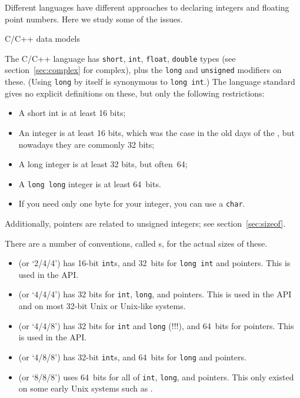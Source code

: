 Different languages have different approaches to declaring integers and
floating point numbers. Here we study some of the issues.

 {C/C++ data models}
\label{sec:data-model}

The C/C++ language has \lstinline{short}, \lstinline{int}, \lstinline{float},
\lstinline{double} types
(see section~\ref{sec:complex} for complex),
plus the \lstinline{long} and \lstinline{unsigned} modifiers on these.
(Using \lstinline{long} by itself is synonymous to \lstinline{long int}.)
%
The language standard gives no explicit definitions on these,
but only the following restrictions:
\begin{itemize}
\item A short int is at least 16 bits;
\item An integer is at least 16 bits, which was the case
  in the old days of the ,
  but nowadays they are commonly 32 bits;
\item A long integer is at least 32 bits, but often~64;
\item A \lstinline{long long} integer is at least 64~bits.
\item If you need only one byte for your integer, you can use a \lstinline{char}.
\end{itemize}
Additionally, pointers are related to unsigned integers;
see section~\ref{sec:sizeof}.

There are a number of conventions, called s,
for the actual sizes of these.
\begin{itemize}
\item {} (or `2/4/4') has 16-bit \lstinline{int}s,
  and 32~bits for \lstinline{long int} and pointers.
  This is used in the  \acs{API}.
\item {} (or `4/4/4')
  has 32 bits for \lstinline{int}, \lstinline{long}, and pointers.
  This is used in the  \acs{API}
  and on most 32-bit Unix or Unix-like systems.
\item {} (or `4/4/8')
  has 32 bits for \lstinline{int} and \lstinline{long} (!!!),
  and 64~bits for pointers.
  This is used in the  API.
\item {} (or `4/8/8')
  has 32-bit \lstinline{int}s, and 64~bits for \lstinline{long} and pointers.
\item {} (or `8/8/8') uses 64~bits for all of
  \lstinline{int}, \lstinline{long}, and pointers.
  This only existed on some early Unix systems such as
  .
\end{itemize}

